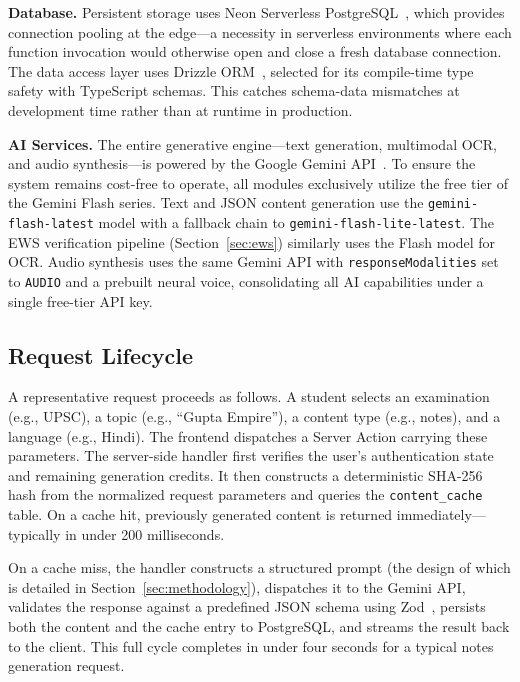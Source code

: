 \documentclass[conference]{IEEEtran}
\begin{document}
\textbf{Database.} Persistent storage uses Neon Serverless PostgreSQL~\cite{neon}, which provides connection pooling at the edge---a necessity in serverless environments where each function invocation would otherwise open and close a fresh database connection. The data access layer uses Drizzle ORM~\cite{drizzle}, selected for its compile-time type safety with TypeScript schemas. This catches schema-data mismatches at development time rather than at runtime in production.

\textbf{AI Services.} The entire generative engine---text generation, multimodal OCR, and audio synthesis---is powered by the Google Gemini API~\cite{gemini}. To ensure the system remains cost-free to operate, all modules exclusively utilize the free tier of the Gemini Flash series. Text and JSON content generation use the \texttt{gemini-flash-latest} model with a fallback chain to \texttt{gemini-flash-lite-latest}. The EWS verification pipeline (Section~\ref{sec:ews}) similarly uses the Flash model for OCR. Audio synthesis uses the same Gemini API with \texttt{responseModalities} set to \texttt{AUDIO} and a prebuilt neural voice, consolidating all AI capabilities under a single free-tier API key.

\subsection{Request Lifecycle}

A representative request proceeds as follows. A student selects an examination (e.g., UPSC), a topic (e.g., ``Gupta Empire''), a content type (e.g., notes), and a language (e.g., Hindi). The frontend dispatches a Server Action carrying these parameters. The server-side handler first verifies the user's authentication state and remaining generation credits. It then constructs a deterministic SHA-256 hash from the normalized request parameters and queries the \texttt{content\_cache} table. On a cache hit, previously generated content is returned immediately---typically in under 200 milliseconds.

On a cache miss, the handler constructs a structured prompt (the design of which is detailed in Section~\ref{sec:methodology}), dispatches it to the Gemini API, validates the response against a predefined JSON schema using Zod~\cite{zod}, persists both the content and the cache entry to PostgreSQL, and streams the result back to the client. This full cycle completes in under four seconds for a typical notes generation request.
\end{document}

